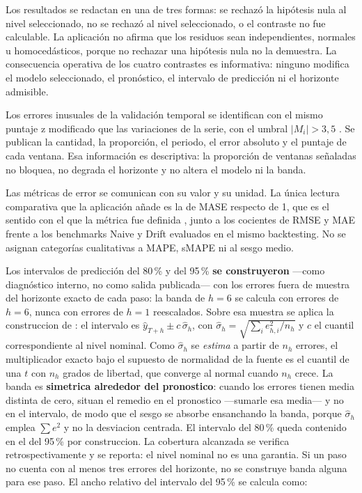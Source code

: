 \documentclass[12pt,letterpaper]{article}
\providecommand{\parencite}{\citep}
\providecommand{\textcite}{\citet}
\begin{document}
Los resultados se redactan en una de tres formas: se rechazó la hipótesis nula al nivel seleccionado, no se rechazó al nivel seleccionado, o el contraste no fue calculable. La aplicación no afirma que los residuos sean independientes, normales u homocedásticos, porque no rechazar una hipótesis nula no la demuestra. La consecuencia operativa de los cuatro contrastes es informativa: ninguno modifica el modelo seleccionado, el pronóstico, el intervalo de predicción ni el horizonte admisible.

Los errores inusuales de la validación temporal se identifican con el mismo puntaje z modificado que las variaciones de la serie, con el umbral \(|M_i|>3{,}5\) \parencite{nist_outliers}. Se publican la cantidad, la proporción, el periodo, el error absoluto y el puntaje de cada ventana. Esa información es descriptiva: la proporción de ventanas señaladas no bloquea, no degrada el horizonte y no altera el modelo ni la banda.

Las métricas de error se comunican con su valor y su unidad. La única lectura comparativa que la aplicación añade es la de MASE respecto de 1, que es el sentido con el que la métrica fue definida \parencite{hyndman_koehler2006}, junto a los cocientes de RMSE y MAE frente a los benchmarks Naive y Drift evaluados en el mismo backtesting. No se asignan categorías cualitativas a MAPE, sMAPE ni al sesgo medio.

Los intervalos de predicción del 80\,\% y del 95\,\% \textbf{se construyeron} ---como diagnóstico interno, no como salida publicada--- con los errores fuera de muestra del horizonte exacto de cada paso: la banda de \(h=6\) se calcula con errores de \(h=6\), nunca con errores de \(h=1\) reescalados. Sobre esa muestra se aplica la construccion de \textcite{hyndman2021fpp3}: el intervalo es \(\hat{y}_{T+h}\pm c\,\hat{\sigma}_h\), con \(\hat{\sigma}_h=\sqrt{\sum_i e_{h,i}^{2}/n_h}\) y \(c\) el cuantil correspondiente al nivel nominal. Como \(\hat{\sigma}_h\) se \emph{estima} a partir de \(n_h\) errores, el multiplicador exacto bajo el supuesto de normalidad de la fuente es el cuantil de una \(t\) con \(n_h\) grados de libertad, que converge al normal cuando \(n_h\) crece. La banda es \textbf{simetrica alrededor del pronostico}: cuando los errores tienen media distinta de cero, \textcite{hyndman2021fpp3} situan el remedio en el pronostico ---sumarle esa media--- y no en el intervalo, de modo que el sesgo se absorbe ensanchando la banda, porque \(\hat{\sigma}_h\) emplea \(\sum e^{2}\) y no la desviacion centrada. El intervalo del 80\,\% queda contenido en el del 95\,\% por construccion. La cobertura alcanzada se verifica retrospectivamente y se reporta: el nivel nominal no es una garantia. Si un paso no cuenta con al menos tres errores del horizonte, no se construye banda alguna para ese paso. El ancho relativo del intervalo del 95\,\% se calcula como:
\end{document}

